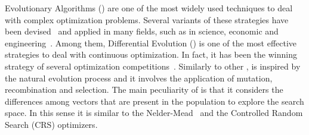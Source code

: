 Evolutionary Algorithms (\EAS{}) are one of the most widely used techniques to deal with complex optimization problems.
%
Several variants of these strategies have been devised~\cite{Talbi:09} and applied in many fields, such as in science, 
economic and engineering~\cite{chakraborty2008advances}.
%
Among them, Differential Evolution (\DE{}) \cite{storn1997differential} is one of the most effective strategies to deal
with continuous optimization.
%
In fact, it has been the winning strategy of several optimization competitions~\cite{das2011differential}.
%
Similarly to other \EAS{}, \DE{} is inspired by the natural evolution process and it involves the application of mutation, recombination and 
selection.
%
The main peculiarity of \DE{} is that it considers the differences among vectors that are present in the population to explore the search space.
%
In this sense it is similar to the Nelder-Mead~\cite{nelder1965simplex} and the 
Controlled Random Search (CRS) \cite{price1983global} optimizers.

